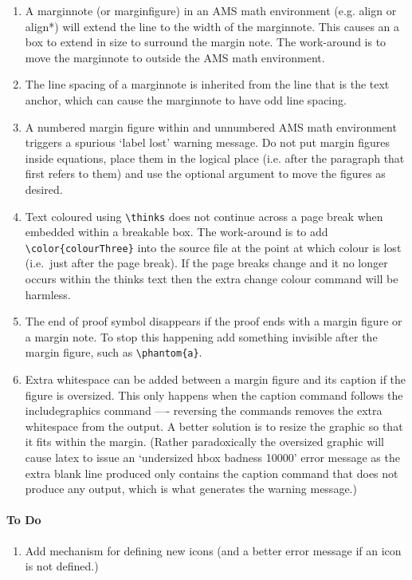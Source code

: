 \documentclass[solutionsatend,twocolumnsolutions]{ouunit}
\begin{document}
\begin{enumerate}[1.]
\item
A marginnote (or marginfigure) in an AMS math environment (e.g. align or align*) will extend the line to the width of the marginnote. This causes an a box to extend in size to surround the margin note. The work-around is to move the marginnote to outside the AMS math environment.
\item
The line spacing of a marginnote is inherited from the line that is the text anchor, which can cause the marginnote to have odd line spacing.
\item
A numbered margin figure within and unnumbered AMS math environment triggers a spurious `label lost' warning message. Do not put margin figures inside equations, place them in the logical place (i.e. after the paragraph that first refers to them) and use the optional argument to move the figures as desired.
\item
Text coloured using \verb"\thinks" does not continue across a page break when embedded within a breakable box. The work-around is to add \verb"\color{colourThree}" into the source file at the point at which colour is lost (i.e.\ just after the page break). If the page breaks change and it no longer occurs within the thinks text then the extra change colour command will be harmless.
\item
The end of proof symbol disappears if the proof ends with a margin figure or a margin note. To stop this happening add something invisible after the margin figure, such as \verb”\phantom{a}”.
\item
Extra whitespace can be added between a margin figure and its caption if the figure is oversized. This only happens when the caption command follows the includegraphics command ---- reversing the commands removes the extra whitespace from the output. A better solution is to resize the graphic so that it fits within the margin. (Rather paradoxically the oversized graphic will cause latex to issue an `undersized hbox badness 10000' error message as the extra blank line produced only contains the caption command that does not produce any output, which is what generates the warning message.)
\end{enumerate}

\paragraph{To Do}
\begin{enumerate}[1.]
\item
Add mechanism for defining new icons (and a better error message if an icon is not defined.)
\end{enumerate}
\printexercisesolutions
\printactivitysolutions
\printindex
\end{document}
